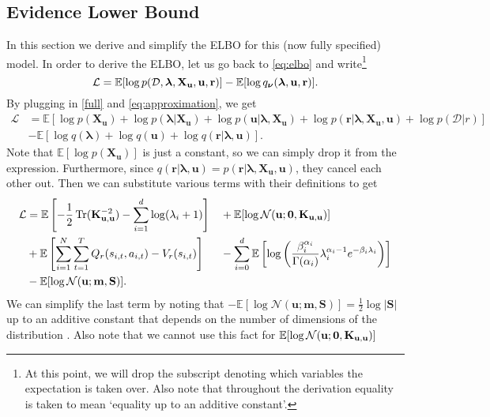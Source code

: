 \documentclass{mprop}
\theoremstyle{definition}
\DeclareMathOperator{\Tr}{Tr}
\begin{document}
\subsection{Evidence Lower Bound} \label{sec:elbo}

In this section we derive and simplify the ELBO for this (now fully specified)
model. In order to derive the ELBO, let us go back to \eqref{eq:elbo} and
write\footnote{At this point, we will drop the subscript denoting which
  variables the expectation is taken over. Also note that throughout the
  derivation equality is taken to mean `equality up to an additive constant'.}
\[ \mathcal{L} = \mathbb{E}[\log p(\mathcal{D}, \bm\lambda, \mathbf{X_u}, \mathbf{u}, \mathbf{r})] -
  \mathbb{E}[\log q_{\bm\nu}(\bm\lambda, \mathbf{u}, \mathbf{r})]. \]
By plugging in \eqref{full} and \eqref{eq:approximation}, we get
\[
  \begin{split}
    \mathcal{L} &= \mathbb{E}[\log p(\mathbf{X_u}) + \log p(\bm\lambda |
    \mathbf{X_u}) + \log p(\mathbf{u} | \bm\lambda, \mathbf{X_u}) + \log
    p(\mathbf{r} | \bm\lambda, \mathbf{X_u}, \mathbf{u}) + \log p(\mathcal{D} | r)] \\
    &- \mathbb{E}[\log q(\bm\lambda) + \log q(\mathbf{u}) + \log q(\mathbf{r} |
    \bm\lambda, \mathbf{u})].
  \end{split}
\]
Note that $\mathbb{E}[\log p(\mathbf{X_u})]$ is just a constant, so we can
simply drop it from the expression. Furthermore, since $q(\mathbf{r} | \bm\lambda,
\mathbf{u}) = p(\mathbf{r} | \bm\lambda, \mathbf{X_u}, \mathbf{u})$, they cancel
each other out. Then we can substitute various terms with their definitions to
get
\begin{alignat*}{3}
  \mathcal{L} &= \mathbb{E}\left[-\frac{1}{2}\Tr(\Kuu^{-2}) -
    \sum_{i=1}^d \log(\lambda_i + 1)\right] &&+ \mathbb{E}[\log
  \mathcal{N}(\mathbf{u}; \mathbf{0}, \Kuu)] \\
  &+ \mathbb{E}\left[ \sum_{i=1}^N \sum_{t=1}^T Q_r(s_{i,t}, a_{i,t}) -
    V_r(s_{i,t}) \right] &&-
  \sum_{i=0}^d\mathbb{E}\left[\log\left(\frac{\beta_i^{\alpha_i}}{\Gamma(\alpha_i)}\lambda_i^{\alpha_i
        - 1}e^{-\beta_i\lambda_i}\right)\right] \\
  &-
  \mathbb{E}[\log\mathcal{N}(\mathbf{u}; \mathbf{m}, \mathbf{S})].
\end{alignat*}
We can simplify the last term by noting that $-\mathbb{E}[\log
\mathcal{N}(\mathbf{u}; \mathbf{m}, \mathbf{S})] = \frac{1}{2}\log|\mathbf{S}|$
up to an additive constant that depends on the number of dimensions of the
distribution \cite{DBLP:journals/tit/AhmedG89}. Also note that we cannot use
this fact for $\mathbb{E}[\log \mathcal{N}(\mathbf{u}; \mathbf{0}, \mathbf{K}_{\mathbf{u},\mathbf{u}})]$
\end{document}
